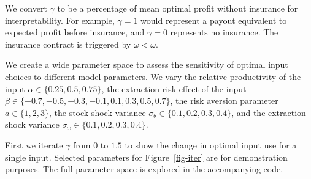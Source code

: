 \documentclass[
  letterpaper,
  DIV=11,
  numbers=noendperiod]{scrartcl}
\theoremstyle{plain}
\theoremstyle{plain}
\theoremstyle{remark}
\begin{document}
We convert \(\gamma\) to be a percentage of mean optimal profit without
insurance for interpretability. For example, \(\gamma=1\) would
represent a payout equivalent to expected profit before insurance, and
\(\gamma=0\) represents no insurance. The insurance contract is
triggered by \(\omega<\bar\omega\).

We create a wide parameter space to assess the sensitivity of optimal
input choices to different model parameters. We vary the relative
productivity of the input \(\alpha\in\{0.25,0.5,0.75\}\), the extraction
risk effect of the input
\(\beta\in\{-0.7,-0.5,-0.3,-0.1,0.1,0.3,0.5,0.7\}\), the risk aversion
parameter \(a\in\{1,2,3\}\), the stock shock variance
\(\sigma_{\theta}\in\{0.1,0.2,0.3,0.4\}\), and the extraction shock
variance \(\sigma_{\omega}\in\{0.1,0.2,0.3,0.4\}\).

First we iterate \(\gamma\) from \(0\) to \(1.5\) to show the change in
optimal input use for a single input. Selected parameters for
Figure~\ref{fig-iter} are for demonstration purposes. The full parameter
space is explored in the accompanying code.
\end{document}
